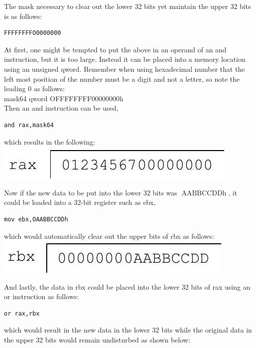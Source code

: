 \documentclass[10pt]{article}
\begin{document}
The mask necessary to clear out the lower 32 bits yet maintain the upper 32 bits is as follows:

\begin{verbatim}
FFFFFFFFO0000000
\end{verbatim}

At first, one might be tempted to put the above in an operand of an and instruction, but it is too large. Instead it can be placed into a memory location using an unsigned qword. Remember when using hexadecimal number that the left most position of the number must be a digit and not a letter, so note the leading 0 as follows:\\
mask64 qword OFFFFFFFF00000000h\\
Then an and instruction can be used,

\begin{verbatim}
and rax,mask64
\end{verbatim}

which results in the following:\\
\includegraphics[max width=\textwidth, center]{2025_03_24_ebe50cc223a6fbc49eecg-260(1)}

Now if the new data to be put into the lower 32 bits was $\operatorname{AABBCCDDh}$, it could be loaded into a 32-bit register such as ebx,

\begin{verbatim}
mov ebx,OAABBCCDDh
\end{verbatim}

which would automatically clear out the upper bits of rbx as follows:\\
\includegraphics[max width=\textwidth, center]{2025_03_24_ebe50cc223a6fbc49eecg-260}

And lastly, the data in rbx could be placed into the lower 32 bits of rax using an or instruction as follows:

\begin{verbatim}
or rax,rbx
\end{verbatim}

which would result in the new data in the lower 32 bits while the original data in the upper 32 bits would remain undisturbed as shown below:
\end{document}
